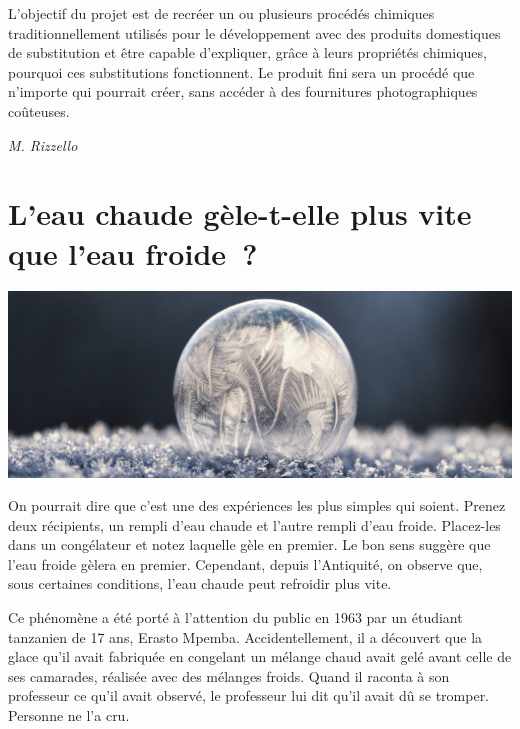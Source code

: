 \documentclass[
  10pt,
  french,
  a5paper,
  openany]{book}
\newenvironment{signature}{\begin{flushright}}{\end{flushright}}
\begin{document}
L'objectif du projet est de recréer un ou plusieurs procédés chimiques traditionnellement utilisés pour le développement avec des produits domestiques de substitution et être capable d'expliquer, grâce à leurs propriétés chimiques, pourquoi ces substitutions fonctionnent. Le produit fini sera un procédé que n'importe qui pourrait créer, sans accéder à des fournitures photographiques coûteuses.

\begin{signature}
\emph{M. Rizzello}

\end{signature}

\hypertarget{leau-chaude-guxe8le-t-elle-plus-vite-que-leau-froide}{%
\chapter{\texorpdfstring{L'eau chaude gèle-t-elle \linebreak plus vite que l'eau froide~?}{L'eau chaude gèle-t-elle plus vite que l'eau froide~?}}\label{leau-chaude-guxe8le-t-elle-plus-vite-que-leau-froide}}

\begin{center}
\includegraphics[width=1\textwidth,height=\textheight]{images/eau-chaude.jpg}

\end{center}

On pourrait dire que c'est une des expériences les plus simples qui soient. Prenez deux récipients, un rempli d'eau chaude et l'autre rempli d'eau froide. Placez-les dans un congélateur et notez laquelle gèle en premier. Le bon sens suggère que l'eau froide gèlera en premier. Cependant, depuis l'Antiquité, on observe que, sous certaines conditions, l'eau chaude peut refroidir plus vite.

Ce phénomène a été porté à l'attention du public en 1963 par un étudiant tanzanien de 17 ans, Erasto Mpemba. Accidentellement, il a découvert que la glace qu'il avait fabriquée en congelant un mélange chaud avait gelé avant celle de ses camarades, réalisée avec des mélanges froids. Quand il raconta à son professeur ce qu'il avait observé, le professeur lui dit qu'il avait dû se tromper. Personne ne l'a cru.
\end{document}
